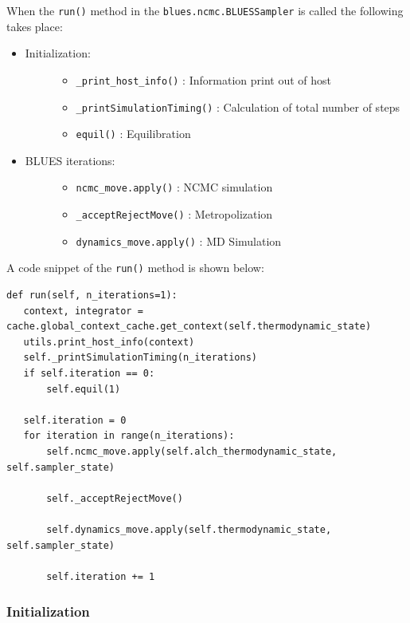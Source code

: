 When the \texttt{run()} method in the \texttt{blues.ncmc.BLUESSampler} is called the following takes place:
\begin{itemize}
\item
  \begin{description}
  \item[Initialization:] 
  \begin{itemize}
  \tightlist
  \item
    \texttt{_print_host_info()} : Information print out of host
  \item
    \texttt{_printSimulationTiming()} : Calculation of total number of steps
  \item
    \texttt{equil()} : Equilibration
  \end{itemize}
  \end{description}
\item
  \begin{description}
  \item[BLUES iterations:]
  \begin{itemize}
  \tightlist
  \item
    \texttt{ncmc_move.apply()} : NCMC simulation
  \item
    \texttt{_acceptRejectMove()} : Metropolization
  \item
    \texttt{dynamics_move.apply()} : MD Simulation
  \end{itemize}
  \end{description}
\end{itemize}

A code snippet of the \texttt{run()} method is shown below:

\begin{verbatim}
def run(self, n_iterations=1):
   context, integrator = cache.global_context_cache.get_context(self.thermodynamic_state)
   utils.print_host_info(context)
   self._printSimulationTiming(n_iterations)
   if self.iteration == 0:
       self.equil(1)

   self.iteration = 0
   for iteration in range(n_iterations):
       self.ncmc_move.apply(self.alch_thermodynamic_state, self.sampler_state)

       self._acceptRejectMove()

       self.dynamics_move.apply(self.thermodynamic_state, self.sampler_state)

       self.iteration += 1
\end{verbatim}

\hypertarget{initialization}{%
\subsubsection{Initialization}\label{initialization}}

